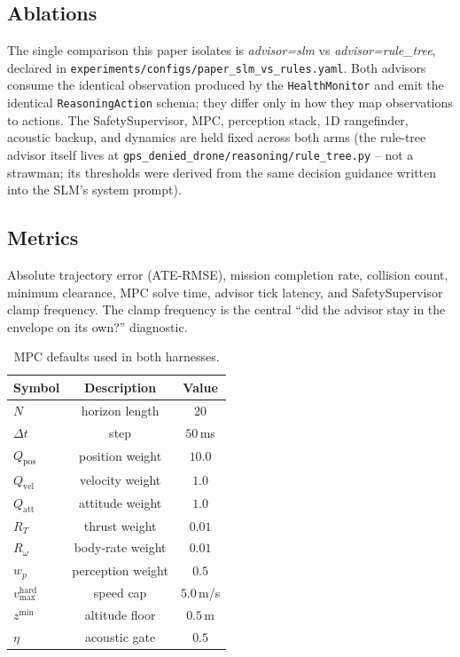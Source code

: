 \subsection{Ablations}
The single comparison this paper isolates is
\textit{advisor=slm} vs \textit{advisor=rule\_tree}, declared in
\texttt{experiments/configs/paper\_slm\_vs\_rules.yaml}. Both
advisors consume the identical observation produced by the
\texttt{HealthMonitor} and emit the identical
\texttt{ReasoningAction} schema; they differ only in how they map
observations to actions. The SafetySupervisor, MPC, perception
stack, 1D rangefinder, acoustic backup, and dynamics are held
fixed across both arms (the rule-tree advisor itself lives at
\texttt{gps\_denied\_drone/reasoning/rule\_tree.py} -- not a
strawman; its thresholds were derived from the same decision
guidance written into the SLM's system prompt).

\subsection{Metrics}
Absolute trajectory error (ATE-RMSE), mission completion rate,
collision count, minimum clearance, MPC solve time, advisor tick
latency, and SafetySupervisor clamp frequency. The clamp frequency
is the central ``did the advisor stay in the envelope on its own?''
diagnostic.

\begin{table}[t]
\caption{MPC defaults used in both harnesses.}
\label{tab:mpc-params}
\centering
\begin{tabular}{lcc}
\hline
Symbol & Description & Value \\
\hline
$N$           & horizon length        & $20$ \\
$\Delta t$    & step                  & $50$\,ms \\
$Q_{\text{pos}}$ & position weight    & $10.0$ \\
$Q_{\text{vel}}$ & velocity weight    & $1.0$ \\
$Q_{\text{att}}$ & attitude weight    & $1.0$ \\
$R_{T}$       & thrust weight         & $0.01$ \\
$R_{\omega}$  & body-rate weight      & $0.01$ \\
$w_p$         & perception weight     & $0.5$ \\
$v_{\max}^{\text{hard}}$ & speed cap   & $5.0$\,m/s \\
$z^{\min}$    & altitude floor        & $0.5$\,m \\
$\eta$        & acoustic gate         & $0.5$ \\
\hline
\end{tabular}
\end{table}

